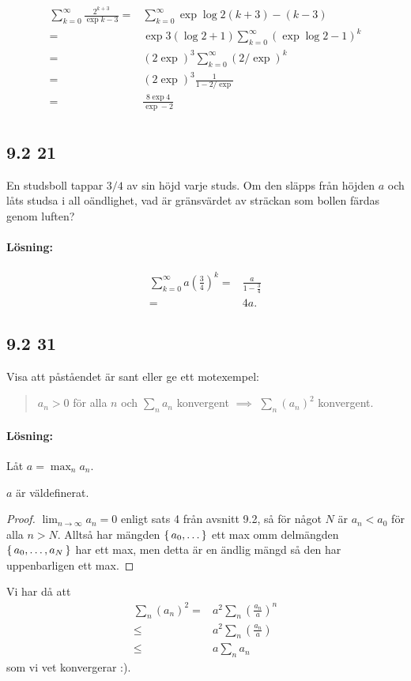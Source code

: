 \begin{align*}
	\sum_{k = 0}^\infty \frac{2^{k + 3}}{\exp{k - 3}} ={}& \sum_{k = 0}^\infty \exp{\log{2} (k + 3) - (k - 3)}\\
	={}& \exp{3 (\log{2} + 1)} \sum_{k = 0}^\infty \left( \exp{\log{2} - 1} \right)^k\\
	={}& (2 \exp{})^3 \sum_{k = 0}^\infty \left( 2 / \exp{} \right)^k\\
	={}& (2 \exp{})^3 \frac{1}{1 - 2 / \exp{}}\\
	={}& \frac{8 \exp{4}}{\exp{} - 2}\\
\end{align*}


\subsection{9.2 21}%
\label{sub:9_2_21}

En studsboll tappar $3/4$ av sin höjd varje studs.
Om den släpps från höjden $a$ och låts studsa i all oändlighet, vad är gränsvärdet av sträckan som bollen färdas genom luften?

\paragraph{Lösning:}

\begin{align*}
	\sum_{k = 0}^\infty a \left( \frac{3}{4} \right)^k ={}& \frac{a}{1 - \frac{3}{4}}\\
	={}& 4 a.
\end{align*}


\subsection{9.2 31}%
\label{sub:9_2_31}

Visa att påståendet är sant eller ge ett motexempel:
\begin{quote}
	$a_n > 0$ för alla $n$ och $\sum_n a_n$ konvergent $\implies$ $\sum_n (a_n)^2$ konvergent.
\end{quote}


\paragraph{Lösning:}

Låt $a = \max_n a_n$.
\begin{lemma}
	$a$ är väldefinerat.
\end{lemma}
\begin{proof}
	$\lim_{n \to \infty} a_n = 0$ enligt sats 4 från avsnitt 9.2, så för något $N$ är $a_n < a_0$ för alla $n > N$.
	Alltså har mängden $\set{a_0, \dots}$ ett max omm delmängden $\set{a_0, \dots, a_N}$ har ett max, men detta är en ändlig mängd så den har uppenbarligen ett max.
\end{proof}

Vi har då att
\begin{align}
	\sum_n (a_n)^2 ={}& a^2 \sum_n \left( \frac{a_n}{a} \right)^n\\
	\leq{}& a^2 \sum_n \left( \frac{a_n}{a} \right)\\
	\leq{}& a \sum_n a_n
\end{align}
som vi vet konvergerar :).









